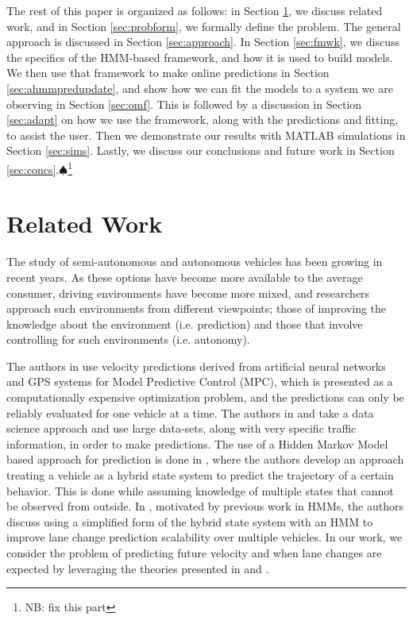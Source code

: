 \documentclass[letterpaper, 10 pt, conference]{ieeeconf}  %
\newcommand\NB[1]{$\spadesuit$\footnote{NB: #1}}
\begin{document}
    The rest of this paper is organized as follows: in Section \ref{sec:relatedwork}, we discuss related work, and in Section \ref{sec:probform}, we formally define the problem. The general approach is discussed in Section \ref{sec:approach}. In Section \ref{sec:fmwk}, we discuss the specifics of the HMM-based framework, and how it is used to build models. We then use that framework to make online predictions in Section \ref{sec:ahmmpredupdate}, and show how we can fit the models to a system we are observing in Section \ref{sec:omf}. This is followed by a discussion in Section \ref{sec:adapt} on how we use the framework, along with the predictions and fitting, to assist the user. Then we demonstrate our results with MATLAB simulations in Section \ref{sec:sims}. Lastly, we discuss our conclusions and future work in Section \ref{sec:concs}.\NB{fix this part}

    

\section{Related Work} \label{sec:relatedwork}

The study of semi-autonomous and autonomous vehicles has been growing in recent years. As these options have become more available to the average consumer, driving environments have become more mixed, and researchers approach such environments from different viewpoints; those of improving the knowledge about the environment (i.e. prediction) and those that involve controlling for such environments (i.e. autonomy).

The authors in \cite{mpc} use velocity predictions derived from artificial neural networks and GPS systems for Model Predictive Control (MPC), which is presented as a computationally expensive optimization problem, and the predictions can only be reliably evaluated for one vehicle at a time. The authors in \cite{velnn} and \cite{veldatadriv} take a data science approach and use large data-sets, along with very specific traffic information, in order to make predictions. The use of a Hidden Markov Model based approach for prediction is done in \cite{lanhmm}, where the authors develop an approach treating a vehicle as a hybrid state system to predict the trajectory of a certain behavior. This is done while assuming knowledge of multiple states that cannot be observed from outside. In \cite{woohmm}, motivated by previous work in HMMs, the authors discuss using a simplified form of the hybrid state system with an HMM to improve lane change prediction scalability over multiple vehicles. In our work, we consider the problem of predicting future velocity and when lane changes are expected by leveraging the theories presented in \cite{mpc} and \cite{woohmm}. 
\end{document}
